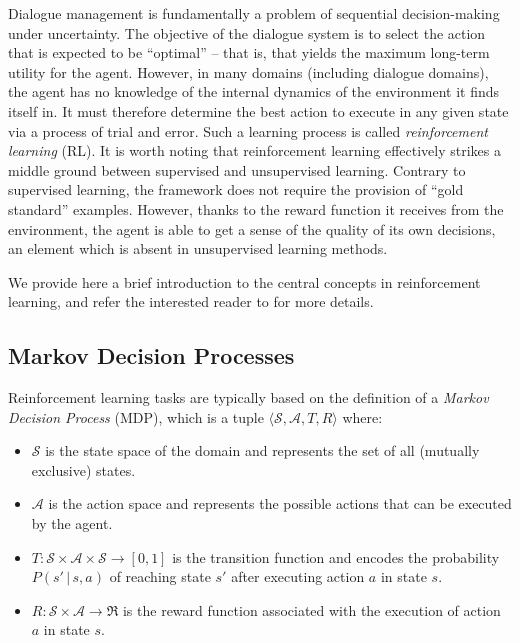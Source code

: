 Dialogue management is fundamentally a problem of sequential decision-making under uncertainty. The objective of the dialogue system is to select the action that is expected to be ``optimal'' -- that is, that yields the maximum long-term utility for the agent. However, in many domains (including dialogue domains), the agent has no knowledge of the internal dynamics of the environment it finds itself in.  It must therefore determine the best action to execute in any given state via a process of trial and error.  Such a learning process is called \textit{reinforcement learning} (RL).  It is worth noting that reinforcement learning effectively strikes a middle ground between supervised and unsupervised learning.  Contrary to supervised learning, the framework does not require the provision of ``gold standard'' examples.  However,  thanks to the reward function it receives from the environment, the agent is able to get a sense of the quality of its own decisions, an element which is absent in unsupervised learning methods.  

We provide here a brief introduction to the central concepts in reinforcement learning, and refer the interested reader to \cite{citeulike:112017} for more details. 

\subsection{Markov Decision Processes}
\label{sec:mdp}

Reinforcement learning tasks are typically based on the definition of a \textit{Markov Decision Process} (MDP), which is a tuple $\langle \mathcal{S}, \mathcal{A}, T, R \rangle$ where:
\begin{itemize}
\item $\mathcal{S}$ is the state space of the domain and represents the set of all (mutually exclusive) states.
\item $\mathcal{A}$ is the action space and represents the possible actions that can be executed by the agent.
\item $T: \mathcal{S} \times \mathcal{A} \times \mathcal{S} \rightarrow [0,1]$ is the transition function and encodes the probability $P(s'\, | \, s,a)$ of reaching state $s'$ after executing action $a$ in state $s$.
\item $R:  \mathcal{S} \times \mathcal{A} \rightarrow \Re$ is the reward function associated with the execution of action $a$ in state $s$.
\end{itemize}
 
